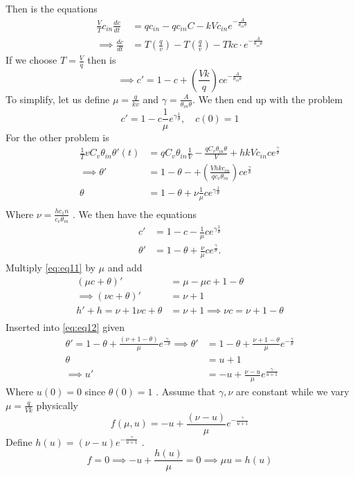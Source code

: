 \documentclass{article}
\theoremstyle{remark}
\begin{document}
Then is the equations \[
  \begin{split}
\frac{V}{T} c_{in} \frac{d c}{d t}  &=  q c_{in} - q c_{in} C - k V c_{in} e^{-\frac{A}{\theta _{in} \theta }}\\ 
 \implies  \frac{d c}{d t}   & = T\left( \frac{q}{v} \right) - T \left( \frac{q}{v} \right) -T kc\cdot e^{-\frac{A}{\theta _{in} \theta }}
  \end{split} 
\] 
If we choose $T = \frac{V}{q}$ then is \[
\implies  c'  = 1- c + \left( \frac{Vk}{q} \right)c e^{-\frac{A}{\theta _{in} \theta }}
\]  
To simplify, let us define $\mu  = \frac{q}{kv}$ and $\gamma = \frac{A}{\theta _{in} \theta }$. We then end up with the problem \[
  c'  = 1- c \frac{1}{\mu } e^{\gamma \frac{1}{\theta } }, \quad  c\left( 0 \right) = 1 
\] 
For the other problem is \[
  \begin{split}
\frac{1}{T} v C_{v} \theta _{in} \theta '  \left( t \right)  & = qC_{v} \theta _{in} \frac{1}{V }  - \frac{q C_{v} \theta _{in} \theta }{V}  + hk V c_{in}c e^{\frac{\gamma}{\theta } } \\
\implies  \theta '   & = 1 - \theta  - + \left( \frac{Vhkc_{in}}{qc_{v} \theta _{in}}  \right) c e^{\frac{\gamma }{\theta } } \\
\theta &=  1- \theta + \nu \frac{1}{\mu }  c e^{\gamma \frac{1}{\theta } }  \\
  \end{split} 
\]  
Where $\nu  = \frac{h c_{1}n}{c_{v} \theta _{in}} $ . We then have the equations 
\begin{align}
  \label{eq:eq11}
  c'  &=  1- c - \frac{1}{\mu } c e^{\gamma \frac{1}{\theta } } \\
  \label{eq:eq12}
  \theta '  &=  1- \theta  + \frac{\nu}{\mu }ce^{\frac{\gamma}{\theta } }   
.\end{align}
Multiply \eqref{eq:eq11}  by $\mu $ and add \[
  \begin{split}
\left( \mu c + \theta  \right)'  &=  \mu  - \mu  c + 1 - \theta  \\
\implies  \left( \nu c + \theta  \right) '   & = \nu + 1  \\
h'  + h = \nu +1
\nu c + \theta &=  \nu +1 \implies  \nu c = \nu + 1 - \theta  \\
  \end{split} 
\] 
Inserted into \eqref{eq:eq12}  given \[
  \begin{split}
\theta '  = 1 - \theta  + \frac{\left( \nu +1 - \theta   \right)}{ \mu }  e^{\frac{\gamma }{- \theta } }
\implies  \theta '  &=  1- \theta + \frac{\nu  + 1 - \theta }{\mu } e^{- \frac{\gamma }{\theta } } \\
\theta  & = u +1  \\
\implies  u'   & = -u + \frac{\nu  - u}{ \mu }  e^{\frac{\gamma}{u+1} }
  \end{split} 
\] 
Where $u\left( 0 \right) = 0$ since $\theta \left( 0 \right) = 1$ . Assume that $\gamma , \nu $ are constant while we vary $\mu = \frac{q}{Vk}$ physically \[
f\left( \mu , u \right)  = -u + \frac{\left( \nu - u \right)}{\mu }  e^{-\frac{\gamma }{u+1} }
\] 
Define $h\left( u \right) = \left( \nu - u \right) e^{- \frac{\gamma }{u+1} }$ . \[
f = 0 \implies  -u + \frac{h\left( u \right)}{\mu } = 0 \implies  \mu  u = h\left( u \right) 
\] 
\end{document}
